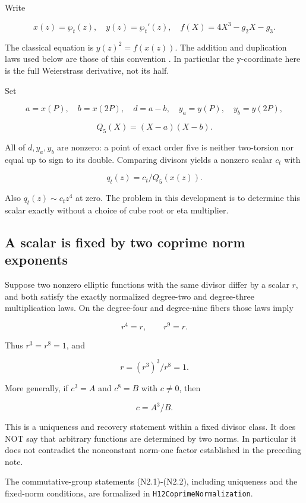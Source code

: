 Write

\[
 x(z)=\wp_t(z),\quad y(z)=\wp_t'(z),\quad
 f(X)=4X^3-g_2X-g_3.
\]

The classical equation is \(y(z)^2=f(x(z))\). The addition and
duplication laws used below are those of this convention
\cite{DLMFWeierstrass}. In particular the y-coordinate here is the full
Weierstrass derivative, not its half.

Set

\[
 a=x(P),\quad b=x(2P),\quad d=a-b,\quad y_a=y(P),\quad y_b=y(2P),
\]

\[
 Q_5(X)=(X-a)(X-b).
\]

All of \(d,y_a,y_b\) are nonzero: a point of exact order five is neither
two-torsion nor equal up to sign to its double. Comparing divisors
yields a nonzero scalar \(c_t\) with

\[
 q_t(z)=c_t/Q_5(x(z)).                                    \tag{N1.2}
\]

Also \(q_t(z)\sim c_tz^4\) at zero. The problem in this development is
to determine this scalar exactly without a choice of cube root or eta
multiplier.

\hypertarget{N-a-scalar-is-fixed-by-two-coprime-norm-exponents}{%
\subsection{A scalar is fixed by two coprime norm
exponents}\label{N-a-scalar-is-fixed-by-two-coprime-norm-exponents}}

Suppose two nonzero elliptic functions with the same divisor differ by a
scalar \(r\), and both satisfy the exactly normalized degree-two and
degree-three multiplication laws. On the degree-four and degree-nine
fibers those laws imply

\[
 r^4=r,\qquad r^9=r.
\]

Thus \(r^3=r^8=1\), and

\[
 r=(r^3)^3/r^8=1.                                       \tag{N2.1}
\]

More generally, if \(c^3=A\) and \(c^8=B\) with \(c\ne0\), then

\[
 \boxed{c=A^3/B.}                                       \tag{N2.2}
\]

This is a uniqueness and recovery statement within a fixed divisor
class. It does NOT say that arbitrary functions are determined by two
norms. In particular it does not contradict the nonconstant norm-one
factor established in the preceding note.

The commutative-group statements (N2.1)-(N2.2), including uniqueness and
the fixed-norm conditions, are formalized in
\texttt{H12CoprimeNormalization}.

